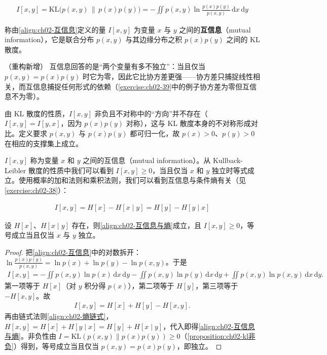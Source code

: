 \documentclass[../../main.tex]{subfiles}
\begin{document}
\begin{align}
  I[x,y] = \mathrm{KL}\big(p(x,y)\,\|\,p(x)p(y)\big) = -\iint p(x,y)\ln\frac{p(x)p(y)}{p(x,y)}\,\mathrm{d}x\,\mathrm{d}y
  \label{align:ch02-互信息}
\end{align}

\begin{definition}[互信息]\label{definition:ch02-互信息}
称由\eqref{align:ch02-互信息}定义的量 $I[x,y]$ 为变量 $x$ 与 $y$ 之间的\textbf{互信息}（mutual information），它是联合分布 $p(x,y)$ 与其边缘分布之积 $p(x)p(y)$ 之间的 KL 散度。
\end{definition}

\begin{remark}（重构新增）
互信息回答的是“两个变量有多不独立”：当且仅当 $p(x,y)=p(x)p(y)$ 时它为零，因此它比协方差更强——协方差只捕捉线性相关，而互信息捕捉任何形式的依赖（\cref{exercise:ch02-39}中的例子协方差为零但互信息不为零）。

由 KL 散度的性质，$I[x,y]$ 非负且不对称中的“方向”并不存在（$I[x,y]=I[y,x]$，因为 $p(x)p(y)$ 对称），这与 KL 散度本身的不对称形成对比。定义要求 $p(x,y)$ 与 $p(x)p(y)$ 都可归一化，故 $p(x)>0$、$p(y)>0$ 在相应的支撑集上成立。
\end{remark}

$I[x,y]$ 称为变量 $x$ 和 $y$ 之间的互信息（mutual information）。从 Kullback-Leibler 散度的性质中我们可以看到 $I[x,y]\geqslant0$，当且仅当 $x$ 和 $y$ 独立时等式成立。使用概率的加和法则和乘积法则，我们可以看到互信息与条件熵有关（见\cref{exercise:ch02-38}）：

\begin{align}
  I[x,y] = H[x] - H[x\mid y] = H[y] - H[y\mid x]
  \label{align:ch02-互信息与熵}
\end{align}

\begin{proposition}[互信息与熵的关系]\label{proposition:ch02-互信息与熵}
设 $H[x]$、$H[x\mid y]$ 存在，则\eqref{align:ch02-互信息与熵}成立，且 $I[x,y]\geqslant0$，等号成立当且仅当 $x$ 与 $y$ 独立。
\end{proposition}

\begin{proof}
把\eqref{align:ch02-互信息}中的对数拆开：$\ln\frac{p(x)p(y)}{p(x,y)} = \ln p(x)+\ln p(y)-\ln p(x,y)$。于是
\begin{align*}
  I[x,y] = -\iint p(x,y)\ln p(x)\,\mathrm{d}x\,\mathrm{d}y - \iint p(x,y)\ln p(y)\,\mathrm{d}x\,\mathrm{d}y + \iint p(x,y)\ln p(x,y)\,\mathrm{d}x\,\mathrm{d}y .
\end{align*}
第一项等于 $H[x]$（对 $y$ 积分得 $p(x)$），第二项等于 $H[y]$，第三项等于 $-H[x,y]$。故
\begin{align*}
  I[x,y] = H[x] + H[y] - H[x,y] .
\end{align*}
再由链式法则\eqref{align:ch02-熵链式}，$H[x,y]=H[x]+H[y\mid x]=H[y]+H[x\mid y]$，代入即得\eqref{align:ch02-互信息与熵}。非负性由 $I=\mathrm{KL}(p(x,y)\|p(x)p(y))\geqslant0$（\cref{proposition:ch02-kl非负}）得到，等号成立当且仅当 $p(x,y)=p(x)p(y)$，即独立。
\end{proof}
\end{document}
